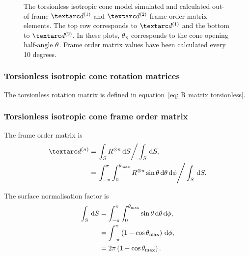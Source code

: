 \begin{figure}
\begin{tabular}{@{}cc@{}}
  \end{tabular}
  \caption[Torsionless isotropic cone simulated and calculated out-of-frame $\FOone$ and $\FOtwo$ elements.]{
    The torsionless isotropic cone model simulated and calculated out-of-frame $\FOone$ and $\FOtwo$ frame order matrix elements.
    The top row corresponds to $\FOone$ and the bottom to $\FOtwo$.
    In these plots, $\theta_\textrm{X}$ corresponds to the cone opening half-angle $\theta$.
    Frame order matrix values have been calculated every 10 degrees.
  }
  \label{fig: simulated and calculated out-of-frame 1st and 2nd degree iso cone, torsionless frame order}
\end{figure}


\subsubsection{Torsionless isotropic cone rotation matrices}

The torsionless rotation matrix is defined in equation~\ref{eq: R matrix torsionless}.


\subsubsection{Torsionless isotropic cone frame order matrix}

The frame order matrix is
\begin{subequations}
\begin{align}
    \FOn &= \left. \int_S R^{\otimes n} \diff S \right / \int_S \diff S , \\
         &= \left. \int_{-\pi}^{\pi} \int_{0}^{\conethetamax} R^{\otimes n} \sin\theta \diff\theta \diff\phi  \right / \int_S \diff S .
\end{align}
\end{subequations}

The surface normalisation factor is
\begin{subequations}
\begin{align}
    \int_S \,\mathrm{d} S &= \int_{-\pi}^{\pi} \int_{0}^{\theta_\textrm{max}} \sin\theta \,\mathrm{d}\theta \,\mathrm{d}\phi , \\
                   &= \int_{-\pi}^{\pi} \left( 1 - \cos\theta_\textrm{max} \right) \,\mathrm{d}\phi , \\
                   &= 2\pi \left( 1 - \cos\theta_\textrm{max} \right) .
\end{align}
\end{subequations}


